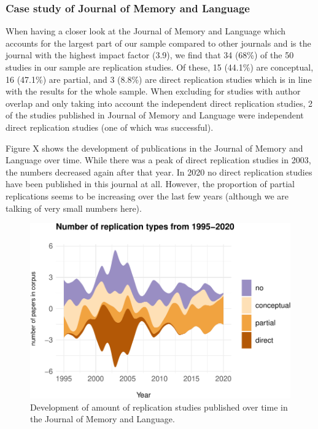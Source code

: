 \documentclass[]{elsarticle} %
\begin{document}
\hypertarget{case-study-of-journal-of-memory-and-language}{%
\subsubsection{Case study of Journal of Memory and
Language}\label{case-study-of-journal-of-memory-and-language}}

When having a closer look at the Journal of Memory and Language which
accounts for the largest part of our sample compared to other journals
and is the journal with the highest impact factor (3.9), we find that 34
(68\%) of the 50 studies in our sample are replication studies. Of
these, 15 (44.1\%) are conceptual, 16 (47.1\%) are partial, and 3
(8.8\%) are direct replication studies which is in line with the results
for the whole sample. When excluding for studies with author overlap and
only taking into account the independent direct replication studies, 2
of the studies published in Journal of Memory and Language were
independent direct replication studies (one of which was successful).

Figure X shows the development of publications in the Journal of Memory
and Language over time. While there was a peak of direct replication
studies in 2003, the numbers decreased again after that year. In 2020 no
direct replication studies have been published in this journal at all.
However, the proportion of partial replications seems to be increasing
over the last few years (although we are talking of very small numbers
here).

\begin{figure}

{\centering \includegraphics[width=1\linewidth]{ReplicationLing_files/figure-latex/jml_stream_plot-1} 

}

\caption{Development of amount of replication studies published over time in the Journal of Memory and Language.}\label{fig:jml_stream_plot}
\end{figure}
\end{document}
